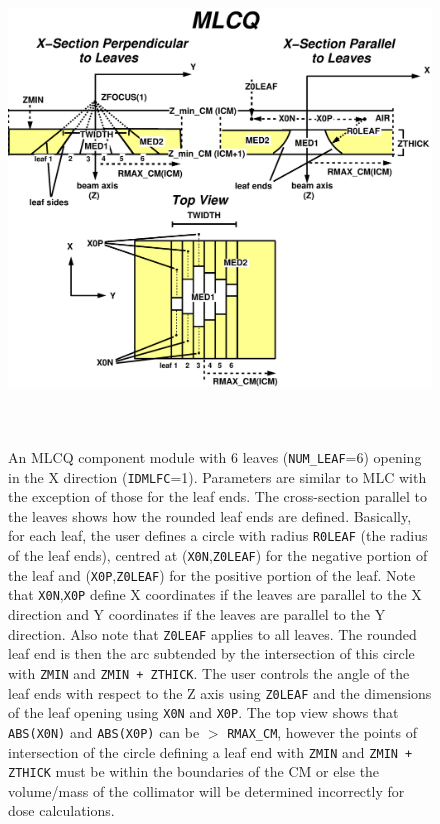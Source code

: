 \documentclass[12pt,twoside]{article}
\begin{document}
\newpage
\begin{figure}[tp]
\begin{center}
\leavevmode
\includegraphics[height=13cm]{figures/mlcqd}
\end{center}
\caption[MLCQ CM geometry]
{An MLCQ component module with 6 leaves ({\tt NUM\_LEAF}=6) opening in the X
direction ({\tt IDMLFC}=1).  Parameters are similar to MLC with the
exception of those for the leaf ends.  The cross-section parallel to the leaves
shows how the rounded leaf ends are defined.  Basically, for each leaf, the user defines a circle
with radius {\tt R0LEAF} (the radius of the leaf ends), centred at
({\tt X0N},{\tt Z0LEAF}) for the negative portion of the leaf and
({\tt X0P},{\tt Z0LEAF}) for the positive portion of the leaf.  Note that {\tt X0N},{\tt X0P}
define X coordinates if the leaves are parallel to the X direction and Y coordinates if the
leaves are parallel to the Y direction.  Also note that {\tt Z0LEAF} applies to all leaves.
The rounded leaf end is then the arc
subtended by the intersection of this circle with {\tt ZMIN} and {\tt ZMIN + ZTHICK}.  The user
controls the angle of the leaf ends with respect to the Z axis using {\tt Z0LEAF} and the
dimensions of the leaf opening using {\tt X0N} and {\tt X0P}.
The top view shows that
{\tt ABS(X0N)} and {\tt ABS(X0P)} can be $>$ {\tt RMAX\_CM}, however the points of
intersection of the circle defining a leaf end with {\tt ZMIN} and {\tt ZMIN + ZTHICK} must
be within the boundaries of the CM or else the volume/mass of the collimator will be determined
incorrectly for dose calculations.}
\label{fig_MLCQD}
\end{figure}
\end{document}
